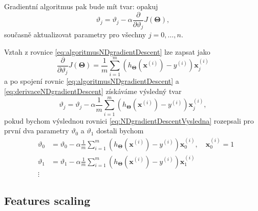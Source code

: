 \par{Gradientní algoritmus pak bude mít tvar: opakuj
\begin{equation}
	\vartheta_j = \vartheta_j - \alpha \frac{\partial}{\partial \vartheta_j} J \left( \bm{\Theta} \right),
	\label{eq:algoritmusNDgradientDescent}
\end{equation}
současně aktualizovat parametry pro všechny $j = 0, \ldots, n$.}

\par{Vztah z rovnice \ref{eq:algoritmusNDgradientDescent} lze zapsat jako
\begin{equation}
	\frac{\partial}{\partial \vartheta_j} J \left( \bm{\Theta} \right) = \frac{1}{m} \sum_{i = 1}^{m} \left( h_{\bm{\Theta}} \left( \bm{x}^{\left( i \right)} \right) - y^{\left( i \right)} \right) \bm{x}^{\left( i \right)}_j
	\label{eq:derivaceNDgradientDescent}	
\end{equation}
a po spojení rovnic 	\ref{eq:algoritmusNDgradientDescent} a \ref{eq:derivaceNDgradientDescent} získáváme výsledný tvar
\begin{equation}
	\vartheta_j = \vartheta_j - \alpha \frac{1}{m} \sum_{i = 1}^{m} \left( h_{\bm{\Theta}} \left( \bm{x}^{\left( i \right)} \right) - y^{\left( i \right)} \right) \bm{x}^{\left( i \right)}_j,
	\label{eq:NDgradientDescentVysledna}
\end{equation}
pokud bychom výslednou rovnici \ref{eq:NDgradientDescentVysledna} rozepsali pro první dva parametry $\vartheta_0$ a $\vartheta_1$ dostali bychom
\begin{eqnarray}
	&\vartheta_0 &= \vartheta_0 - \alpha \frac{1}{m} \sum_{i = 1}^{m} \left( h_{\bm{\Theta}} \left( \bm{x}^{\left( i \right)} \right) - y^{\left( i \right)} \right) \bm{x}^{\left( i \right)}_0, \quad \bm{x}^{\left( i \right)}_0 = 1\\
	&\vartheta_1 &= \vartheta_1 - \alpha \frac{1}{m} \sum_{i = 1}^{m} \left( h_{\bm{\Theta}} \left( \bm{x}^{\left( i \right)} \right) - y^{\left( i \right)} \right) \bm{x}^{\left( i \right)}_1\\
	\nonumber
	&\vdots
\end{eqnarray}}




\newpage









\subsection{Features scaling}
\label{sec:featuresScaling}

